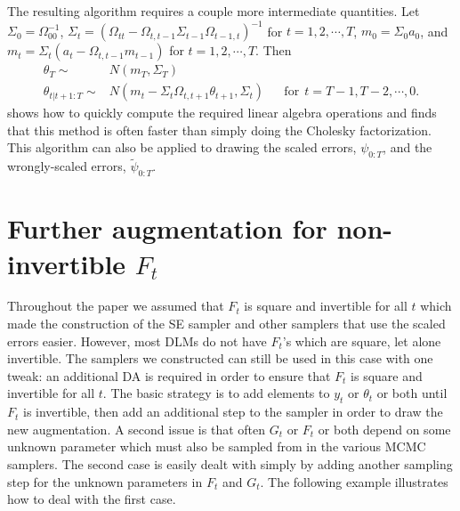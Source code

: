\documentclass{article}
\begin{document}
The resulting algorithm requires a couple more intermediate quantities. Let $\Sigma_0 = \Omega_{00}^{-1}$, $\Sigma_t = (\Omega_{tt} - \Omega_{t,t-1}\Sigma_{t-1}\Omega_{t-1,t})^{-1}$ for $t=1,2,\cdots,T$, $m_0 = \Sigma_0a_0$, and $m_t = \Sigma_t(a_t - \Omega_{t,t-1}m_{t-1})$ for $t=1,2,\cdots,T$. Then
\begin{align*}
  \theta_T \sim & N(m_T, \Sigma_T) &&\\
  \theta_{t|t+1:T} \sim & N(m_t - \Sigma_t\Omega_{t,t+1}\theta_{t+1}, \Sigma_t) && \mathrm{for}\ \ t=T-1,T-2,\cdots,0.
\end{align*}
 shows how to quickly compute the required linear algebra operations and finds that this method is often faster than simply doing the Cholesky factorization. This algorithm can also be applied to drawing the scaled errors, $\psi_{0:T}$, and the wrongly-scaled errors, $\tilde{\psi}_{0:T}$.

\section{Further augmentation for non-invertible $F_t$}\label{sec:F}

Throughout the paper we assumed that $F_t$ is square and invertible for all $t$ which made the construction of the SE sampler and other samplers that use the scaled errors easier. However, most DLMs do not have $F_t$'s which are square, let alone invertible. The samplers we constructed can still be used in this case with one tweak: an additional DA is required in order to ensure that $F_t$ is square and invertible for all $t$. The basic strategy is to add elements to $y_t$ or $\theta_t$ or both until $F_t$ is invertible, then add an additional step to the sampler in order to draw the new augmentation. A second issue is that often $G_t$ or $F_t$ or both depend on some unknown parameter which must also be sampled from in the various MCMC samplers. The second case is easily dealt with simply by adding another sampling step for the unknown parameters in $F_t$ and $G_t$. The following example illustrates how to deal with the first case.
\end{document}
